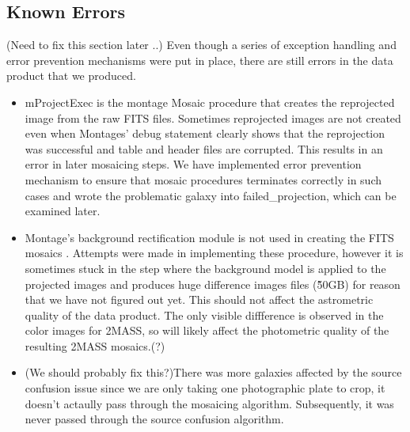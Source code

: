 \documentclass[5p]{elsarticle}
\begin{document}
	\subsection{Known Errors}
	(Need to fix this section later ..)
	Even though a series of exception handling and error prevention mechanisms were put in place,  there are still errors in the data product that we produced.
	 	\begin{itemize}
	 		\item mProjectExec is the montage Mosaic procedure that creates the reprojected image from the raw FITS files. Sometimes reprojected images are not created even when Montages' debug statement clearly shows that the reprojection was successful and table and header files are corrupted. This results in an error in later mosaicing steps. We have implemented error prevention mechanism to ensure that mosaic procedures terminates correctly in such cases and wrote the problematic galaxy into failed\_projection, which can be examined later.
	 		\item Montage's background rectification module is not used in creating the FITS mosaics . Attempts were made in implementing these procedure, however it  is sometimes stuck in the step where the background model is applied to the projected images and  produces huge difference images files (\~50GB) for reason that we have not figured out yet. This should not affect the astrometric quality of the data product. The only visible diffference is observed in the color images for 2MASS, so will likely affect the photometric quality of the resulting 2MASS mosaics.(?)
	 	  \item (We should probably fix this?)There was more galaxies affected by the source confusion issue since we are only taking one photographic plate to crop, it doesn't actaully pass through the mosaicing algorithm. Subsequently,  it was never passed through the source confusion algorithm. 
	 	\end{itemize}
	
\end{document}
